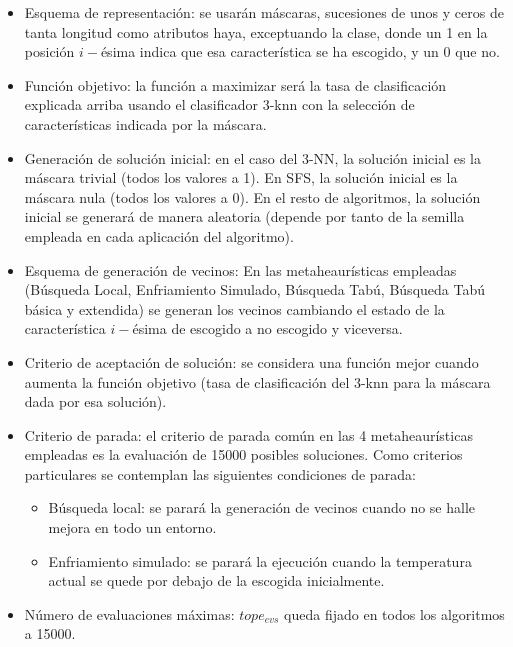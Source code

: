 \documentclass[a4paper,11pt]{article}
\begin{document}
\begin{itemize} 
\item Esquema de representación: se usarán máscaras, sucesiones de unos y ceros de tanta longitud como atributos haya,
exceptuando la clase, donde un 1 en la posición $i-$ésima indica que esa característica se ha escogido, y un $0$ que no.
\item Función objetivo: la función a maximizar será la tasa de clasificación explicada arriba usando el clasificador
3-knn con la selección de características indicada por la máscara.

\small\texttt{}

\item Generación de solución inicial: en el caso del 3-NN, la solución inicial es la máscara trivial (todos los valores a 1).
En SFS, la solución inicial es la máscara nula (todos los valores a 0). En el resto de algoritmos, la solución inicial se
generará de manera aleatoria (depende por tanto de la semilla empleada en cada aplicación del algoritmo).
\item Esquema de generación de vecinos: En las metaheaurísticas empleadas (Búsqueda Local, Enfriamiento Simulado, Búsqueda
Tabú, Búsqueda Tabú básica y extendida) se generan los vecinos cambiando el estado de la característica $i-$ésima de
escogido a no escogido y viceversa.

\small\texttt{}

\item Criterio de aceptación de solución: se considera una función mejor cuando aumenta la función objetivo (tasa de 
clasificación del 3-knn para la máscara dada por esa solución).
\item Criterio de parada: el criterio de parada común en las 4 metaheaurísticas empleadas es la evaluación de 15000 posibles
soluciones. Como criterios particulares se contemplan las siguientes condiciones de parada:
  \begin{itemize}
    \item Búsqueda local: se parará la generación de vecinos cuando no se halle mejora en todo un entorno.
    \item Enfriamiento simulado: se parará la ejecución cuando la temperatura actual se quede por debajo de la escogida
    inicialmente.
  \end{itemize}
  
\item Número de evaluaciones máximas: $tope_{evs}$ queda fijado en todos los algoritmos a 15000.

\end{itemize}
\end{document}
